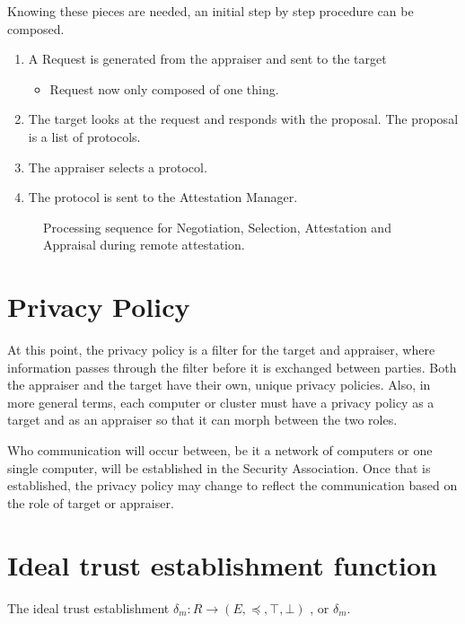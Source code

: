 \documentclass[10pt]{report}
\newcommand{\squash}{\itemsep=0pt\parskip=0pt}
\begin{document}
Knowing these pieces are needed, an initial step by step procedure can be composed.

\begin{enumerate}
\squash
\item A Request is generated from the appraiser and sent to the target
	\begin{itemize}
	\squash
	\item Request now only composed of one thing.
	\end{itemize}
\item The target looks at the request and responds with the proposal. The
        proposal is a list of protocols. 
\item The appraiser selects a protocol.
\item The protocol is sent to the Attestation Manager.  
\end{enumerate} 

\begin{figure}[hbtp]
  \centering
  
  \caption[Attestation and Appraisal Sequence for One Request]{Processing sequence for
    Negotiation, Selection, Attestation and Appraisal during remote
    attestation.}
  \label{fig:att-app-seq}
\end{figure}

\section{Privacy Policy}

At this point, the privacy policy is a filter for the target and appraiser, where 
information passes through the filter before it is exchanged between parties. 
Both the appraiser and the target have their own, unique
privacy policies. Also, in more general terms, each computer or cluster
must have a privacy policy as a target and as an appraiser so that it
can morph between the two roles. 

Who communication will occur between, be it a network of computers or
one single computer, will be established in the Security Association.
Once that is established, the privacy policy may change to reflect
the communication based on the role of target or appraiser. 

\section{Ideal trust establishment function}

The ideal trust establishment $\delta_m:R\rightarrow (E,\preceq,\top,\bot)$ ,
or $\delta_m$. 
\end{document}
